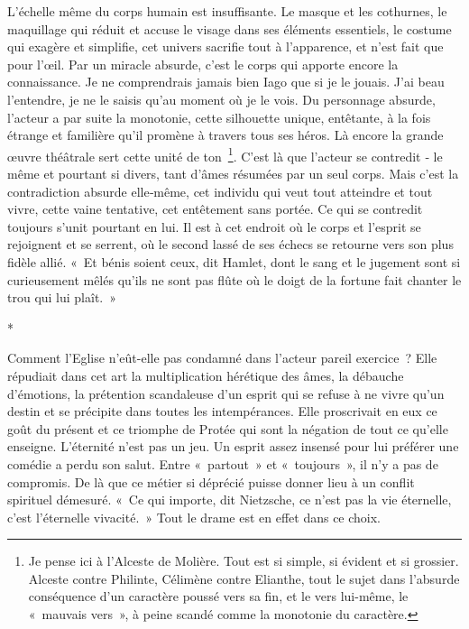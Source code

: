 \documentclass{book}
\begin{document}
L'échelle même du corps humain est insuffisante. Le masque et les cothurnes, le maquillage qui réduit et accuse le visage dans ses éléments essentiels, le costume qui exagère et simplifie, cet univers sacrifie tout à l'apparence, et n'est fait que pour l'œil. Par un miracle absurde, c'est le corps qui apporte encore la connaissance. Je ne comprendrais jamais bien Iago que si je le jouais. J'ai beau l'entendre, je ne le saisis qu'au moment où je le vois. Du personnage absurde, l'acteur a par suite la monotonie, cette silhouette unique, entêtante, à la fois étrange et familière qu'il promène à travers tous ses héros. Là encore la grande œuvre théâtrale sert cette unité de ton \footnote{Je pense ici à l'Alceste de Molière. Tout est si simple, si évident et si grossier. Alceste contre Philinte, Célimène contre Elianthe, tout le sujet dans l'absurde conséquence d'un caractère poussé vers sa fin, et le vers lui-même, le « mauvais vers », à peine scandé comme la monotonie du caractère.}. C'est là que l'acteur se contredit ‑ le même et pourtant si divers, tant d'âmes résumées par un seul corps. Mais c'est la contradiction absurde elle‑même, cet individu qui veut tout atteindre et tout vivre, cette vaine tentative, cet entêtement sans portée. Ce qui se contredit toujours s'unit pourtant en lui. Il est à cet endroit où le corps et l'esprit se rejoignent et se serrent, où le second lassé de ses échecs se retourne vers son plus fidèle allié. « Et bénis soient ceux, dit Hamlet, dont le sang et le jugement sont si curieusement mêlés qu'ils ne sont pas flûte où le doigt de la fortune fait chanter le trou qui lui plaît. »

\begin{center}
*
\end{center}

Comment l'Eglise n'eût-elle pas condamné dans l'acteur pareil exercice ? Elle répudiait dans cet art la multiplication hérétique des âmes, la débauche d'émotions, la prétention scandaleuse d'un esprit qui se refuse à ne vivre qu'un destin et se précipite dans toutes les intempérances. Elle proscrivait en eux ce goût du présent et ce triomphe de Protée qui sont la négation de tout ce qu'elle enseigne. L'éternité n'est pas un jeu. Un esprit assez insensé pour lui préférer une comédie a perdu son salut. Entre « partout » et « toujours », il n'y a pas de compromis. De là que ce métier si déprécié puisse donner lieu à un conflit spirituel démesuré. « Ce qui importe, dit Nietzsche, ce n'est pas la vie éternelle, c'est l'éternelle vivacité. » Tout le drame est en effet dans ce choix.
\end{document}
